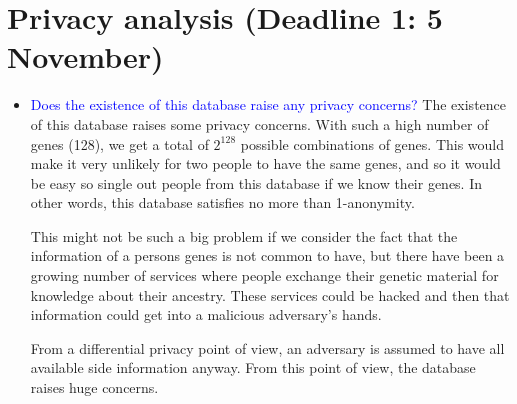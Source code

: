 
\section*{Privacy analysis (Deadline 1: 5 November)}
\begin{itemize}
    \item \textcolor{blue}{Does the existence of this database raise any privacy concerns?}
    The existence of this database raises some privacy concerns. With such a high number of genes (128), we get a total of $2^{128}$ possible combinations of genes. This would make it very unlikely for two people to have the same genes, and so it would be easy so single out people from this database if we know their genes. In other words, this database satisfies no more than 1-anonymity. 
    
    This might not be such a big problem if we consider the fact that the information of a persons genes is not common to have, but there have been a growing number of services where people exchange their genetic material for knowledge about their ancestry. These services could be hacked and then that information could get into a malicious adversary's hands. 
    
    From a differential privacy point of view, an adversary is assumed to have all available side information anyway. From this point of view, the database raises huge concerns. 
    

\end{itemize}
